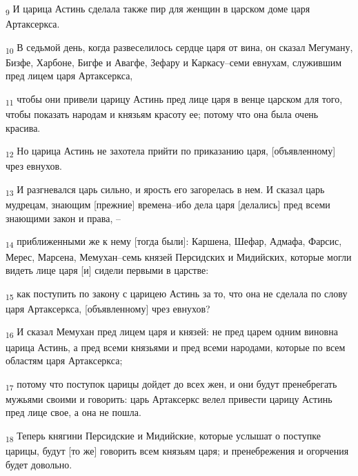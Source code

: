 \begin{tcolorbox}
\textsubscript{9} И царица Астинь сделала также пир для женщин в царском доме царя Артаксеркса.
\end{tcolorbox}
\begin{tcolorbox}
\textsubscript{10} В седьмой день, когда развеселилось сердце царя от вина, он сказал Мегуману, Бизфе, Харбоне, Бигфе и Авагфе, Зефару и Каркасу--семи евнухам, служившим пред лицем царя Артаксеркса,
\end{tcolorbox}
\begin{tcolorbox}
\textsubscript{11} чтобы они привели царицу Астинь пред лице царя в венце царском для того, чтобы показать народам и князьям красоту ее; потому что она была очень красива.
\end{tcolorbox}
\begin{tcolorbox}
\textsubscript{12} Но царица Астинь не захотела прийти по приказанию царя, [объявленному] чрез евнухов.
\end{tcolorbox}
\begin{tcolorbox}
\textsubscript{13} И разгневался царь сильно, и ярость его загорелась в нем. И сказал царь мудрецам, знающим [прежние] времена--ибо дела царя [делались] пред всеми знающими закон и права, --
\end{tcolorbox}
\begin{tcolorbox}
\textsubscript{14} приближенными же к нему [тогда были]: Каршена, Шефар, Адмафа, Фарсис, Мерес, Марсена, Мемухан--семь князей Персидских и Мидийских, которые могли видеть лице царя [и] сидели первыми в царстве:
\end{tcolorbox}
\begin{tcolorbox}
\textsubscript{15} как поступить по закону с царицею Астинь за то, что она не сделала по слову царя Артаксеркса, [объявленному] чрез евнухов?
\end{tcolorbox}
\begin{tcolorbox}
\textsubscript{16} И сказал Мемухан пред лицем царя и князей: не пред царем одним виновна царица Астинь, а пред всеми князьями и пред всеми народами, которые по всем областям царя Артаксеркса;
\end{tcolorbox}
\begin{tcolorbox}
\textsubscript{17} потому что поступок царицы дойдет до всех жен, и они будут пренебрегать мужьями своими и говорить: царь Артаксеркс велел привести царицу Астинь пред лице свое, а она не пошла.
\end{tcolorbox}
\begin{tcolorbox}
\textsubscript{18} Теперь княгини Персидские и Мидийские, которые услышат о поступке царицы, будут [то же] говорить всем князьям царя; и пренебрежения и огорчения будет довольно.
\end{tcolorbox}
